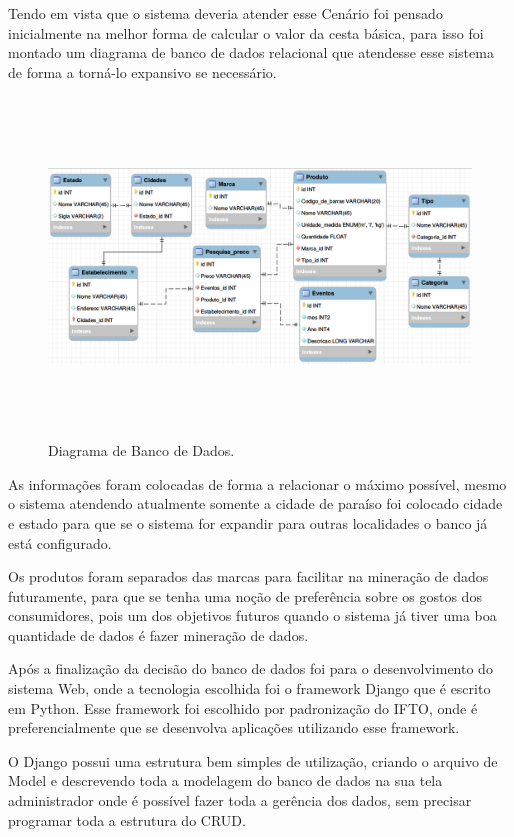 \documentclass{ifto-tex}
\begin{document}
	Tendo em vista que o sistema deveria atender esse Cenário foi pensado inicialmente na melhor forma de calcular o valor da cesta básica, para isso foi montado um diagrama de banco de dados relacional que  atendesse esse sistema de forma a torná-lo expansivo se necessário.
	\begin{figure}[H]
		\begin{center}
			\includegraphics[width=16.0cm, height= 9.0cm]{cestadiagrama.png}    %
			\caption{Diagrama de Banco de Dados.} 
			\label{fig:faces}
		\end{center}
	\end{figure}
As informações foram colocadas de forma a relacionar o máximo possível, mesmo o sistema atendendo atualmente somente a cidade de paraíso foi colocado cidade e estado para que se o sistema for expandir para outras localidades o banco já está configurado.

Os produtos foram separados das marcas para facilitar na mineração de dados futuramente, para que se tenha uma noção de preferência sobre os gostos dos consumidores, pois um dos objetivos futuros quando o sistema já tiver uma boa quantidade de dados é fazer mineração de dados.

Após a finalização da decisão do banco de dados foi para o desenvolvimento do sistema Web, onde a tecnologia escolhida foi o framework Django que é escrito em Python. Esse framework foi escolhido por padronização do IFTO, onde é preferencialmente que se desenvolva aplicações utilizando esse framework.

O Django possui uma estrutura bem simples de utilização, criando o arquivo de Model e descrevendo toda a modelagem do banco de dados na sua tela administrador onde é possível fazer toda a gerência dos dados, sem precisar programar toda a estrutura do CRUD.
\end{document}
